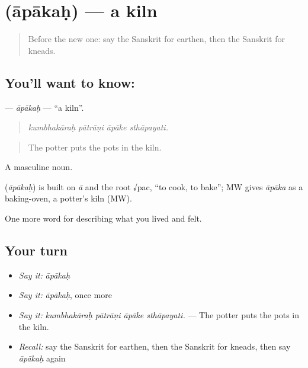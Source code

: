 \section[\texorpdfstring{\sk{आपाकः} (āpākaḥ)}{आपाकः (āpākaḥ)}]{ (āpākaḥ) — a kiln}

\label{lesson:SA-C505-apakah}



\begin{quote}
Before the new one: say the Sanskrit for earthen, then the Sanskrit for kneads.
\end{quote}

\subsection*{You'll want to know: }
\textbf{} — \emph{āpākaḥ} — \textquotedblleft{}a kiln\textquotedblright{}.

\begin{quote}
   
\end{quote}

\begin{quote}
\emph{kumbhakāraḥ pātrāṇi āpāke sthāpayati.}
\end{quote}

\begin{quote}
The potter puts the pots in the kiln.
\end{quote}

A masculine noun.

\begin{cousinweb}
\textbf{} (\emph{āpākaḥ}) is built on \emph{ā} and the root √pac, \textquotedblleft{}to cook, to bake\textquotedblright{}; MW gives \emph{āpāka} as a baking-oven, a potter's kiln (MW).
\end{cousinweb}

\begin{grammarlens}[title={What you've built}]
One more word for describing what you lived and felt.
\end{grammarlens}

\subsection*{Your turn}
\begin{itemize}
\raggedright
  \item \emph{Say it:} \emph{āpākaḥ}
  \item \emph{Say it:} \emph{āpākaḥ}, once more
  \item \emph{Say it:} \emph{kumbhakāraḥ pātrāṇi āpāke sthāpayati.} — The potter puts the pots in the kiln.
  \item \emph{Recall:} say the Sanskrit for earthen, then the Sanskrit for kneads, then say \emph{āpākaḥ} again
\end{itemize}

